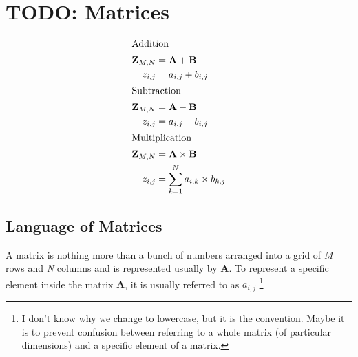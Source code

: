 \chapter{TODO: Matrices}
\label{chap:Matrices}

\begin{align}
  \intertext{Addition}
  \mathbf{Z}_{M,N} & = \mathbf{A} + \mathbf{B} \nonumber \\
         {z}_{i,j} & = {a}_{i,j} + {b}_{i,j} \\
  \intertext{Subtraction}
  \mathbf{Z}_{M,N} & = \mathbf{A} - \mathbf{B} \nonumber \\
         {z}_{i,j} & = {a}_{i,j} - {b}_{i,j} \\
  \intertext{Multiplication}
  \mathbf{Z}_{M,N} & = \mathbf{A} \times \mathbf{B} \nonumber \\
         {z}_{i,j} & = \sum_{k=1}^{N} {a}_{i,k} \times {b}_{k,j}
\end{align}

\section{Language of Matrices}
\label{sec:LanguageOfMatrices}
A matrix is nothing more than a bunch of numbers arranged into a grid of
\emph{M} rows and \emph{N} columns and is represented usually by $\mathbf{A}$.
To represent a specific element inside the matrix $\mathbf{A}$, it is usually
referred to as $a_{i,j}$ \footnote{I don't know why we change to lowercase, but
it is the convention. Maybe it is to prevent confusion between referring to a
whole matrix (of particular dimensions) and a specific element of a matrix.}

